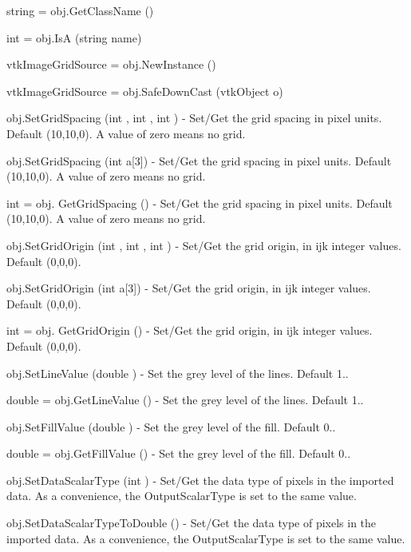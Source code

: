 \begin{DoxyItemize}
\item {\ttfamily string = obj.\-Get\-Class\-Name ()}  
\item {\ttfamily int = obj.\-Is\-A (string name)}  
\item {\ttfamily vtk\-Image\-Grid\-Source = obj.\-New\-Instance ()}  
\item {\ttfamily vtk\-Image\-Grid\-Source = obj.\-Safe\-Down\-Cast (vtk\-Object o)}  
\item {\ttfamily obj.\-Set\-Grid\-Spacing (int , int , int )} -\/ Set/\-Get the grid spacing in pixel units. Default (10,10,0). A value of zero means no grid.  
\item {\ttfamily obj.\-Set\-Grid\-Spacing (int a\mbox{[}3\mbox{]})} -\/ Set/\-Get the grid spacing in pixel units. Default (10,10,0). A value of zero means no grid.  
\item {\ttfamily int = obj. Get\-Grid\-Spacing ()} -\/ Set/\-Get the grid spacing in pixel units. Default (10,10,0). A value of zero means no grid.  
\item {\ttfamily obj.\-Set\-Grid\-Origin (int , int , int )} -\/ Set/\-Get the grid origin, in ijk integer values. Default (0,0,0).  
\item {\ttfamily obj.\-Set\-Grid\-Origin (int a\mbox{[}3\mbox{]})} -\/ Set/\-Get the grid origin, in ijk integer values. Default (0,0,0).  
\item {\ttfamily int = obj. Get\-Grid\-Origin ()} -\/ Set/\-Get the grid origin, in ijk integer values. Default (0,0,0).  
\item {\ttfamily obj.\-Set\-Line\-Value (double )} -\/ Set the grey level of the lines. Default 1..  
\item {\ttfamily double = obj.\-Get\-Line\-Value ()} -\/ Set the grey level of the lines. Default 1..  
\item {\ttfamily obj.\-Set\-Fill\-Value (double )} -\/ Set the grey level of the fill. Default 0..  
\item {\ttfamily double = obj.\-Get\-Fill\-Value ()} -\/ Set the grey level of the fill. Default 0..  
\item {\ttfamily obj.\-Set\-Data\-Scalar\-Type (int )} -\/ Set/\-Get the data type of pixels in the imported data. As a convenience, the Output\-Scalar\-Type is set to the same value.  
\item {\ttfamily obj.\-Set\-Data\-Scalar\-Type\-To\-Double ()} -\/ Set/\-Get the data type of pixels in the imported data. As a convenience, the Output\-Scalar\-Type is set to the same value.  

\end{DoxyItemize}

